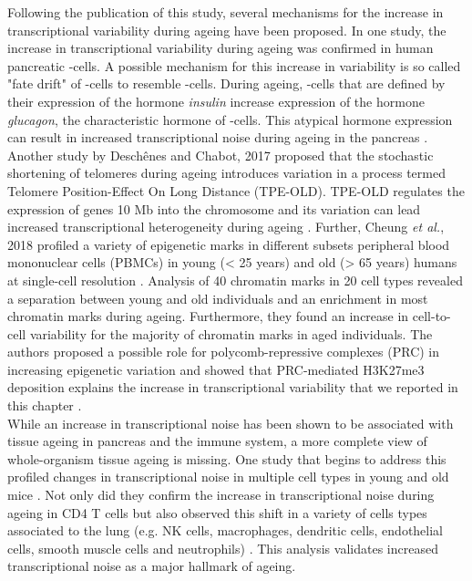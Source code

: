 Following the publication of this study, several mechanisms for the increase in transcriptional variability during ageing have been proposed. In one study, the increase in transcriptional variability during ageing was confirmed in human pancreatic \textbeta{}-cells. A possible mechanism for this increase in variability is so called "fate drift" of \textbeta{}-cells to resemble \textalpha{}-cells. During ageing, \textbeta{}-cells that are defined by their expression of the hormone \emph{insulin} increase expression of the hormone \emph{glucagon}, the characteristic hormone of \textalpha{}-cells. This atypical hormone expression can result in increased transcriptional noise during ageing in the pancreas \citep{Enge2017}. Another study by Desch\^{e}nes and Chabot, 2017 proposed that the stochastic shortening of telomeres during ageing introduces variation in a process termed Telomere Position-Effect On Long Distance (TPE-OLD). 	TPE-OLD regulates the expression of genes 10 Mb into the chromosome and its variation can lead increased transcriptional heterogeneity during ageing \cite{Deschenes2017}. Further, Cheung \emph{et al.}, 2018 profiled a variety of epigenetic marks in different subsets peripheral blood mononuclear cells (PBMCs) in young (< 25 years) and old (> 65 years) humans at single-cell resolution \citep{Cheung2018}. Analysis of 40 chromatin marks in 20 cell types revealed a separation between young and old individuals and an enrichment in most chromatin marks during ageing. Furthermore, they found an increase in cell-to-cell variability for the majority of chromatin marks in aged individuals. The authors proposed a possible role for polycomb-repressive complexes (PRC) in increasing epigenetic variation and showed that PRC-mediated H3K27me3 deposition explains the increase in transcriptional variability that we reported in this chapter \citep{Cheung2018}.\\

While an increase in transcriptional noise has been shown to be associated with tissue ageing in pancreas and the immune system, a more complete view of whole-organism tissue ageing is missing. One study that begins to address this profiled changes in transcriptional noise in multiple cell types in young and old mice \citep{Angelidis2018}. Not only did they confirm the increase in transcriptional noise during ageing in CD4\plus{} T cells but also observed this shift in a variety of cells types associated to the lung (e.g. NK cells, macrophages, dendritic cells, endothelial cells, smooth muscle cells and neutrophils) \citep{Angelidis2018}. This analysis validates increased transcriptional noise as a major hallmark of ageing. \\

